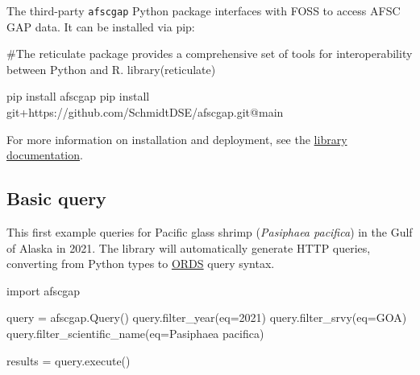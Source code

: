 \documentclass[
  letterpaper,
  oneside,
  open=any]{scrbook}
\newenvironment{Shaded}{\begin{snugshade}}{\end{snugshade}}
\newcommand{\AttributeTok}[1]{\textcolor[rgb]{0.40,0.45,0.13}{#1}}
\newcommand{\CommentTok}[1]{\textcolor[rgb]{0.37,0.37,0.37}{#1}}
\newcommand{\DecValTok}[1]{\textcolor[rgb]{0.68,0.00,0.00}{#1}}
\newcommand{\ErrorTok}[1]{\textcolor[rgb]{0.68,0.00,0.00}{#1}}
\newcommand{\FunctionTok}[1]{\textcolor[rgb]{0.28,0.35,0.67}{#1}}
\newcommand{\NormalTok}[1]{\textcolor[rgb]{0.00,0.23,0.31}{#1}}
\newcommand{\OtherTok}[1]{\textcolor[rgb]{0.00,0.23,0.31}{#1}}
\newcommand{\SpecialCharTok}[1]{\textcolor[rgb]{0.37,0.37,0.37}{#1}}
\newcommand{\StringTok}[1]{\textcolor[rgb]{0.13,0.47,0.30}{#1}}
\begin{document}
The third-party \texttt{afscgap} Python package interfaces with FOSS to
access AFSC GAP data. It can be installed via pip:

\begin{Shaded}
\begin{Highlighting}[]
\CommentTok{\#The reticulate package provides a comprehensive set of tools for interoperability between Python and R. }
\FunctionTok{library}\NormalTok{(reticulate)}
\end{Highlighting}
\end{Shaded}

\begin{Shaded}
\begin{Highlighting}[]
\NormalTok{pip install afscgap}
\NormalTok{pip install git}\SpecialCharTok{+}\NormalTok{https}\SpecialCharTok{:}\ErrorTok{//}\NormalTok{github.com}\SpecialCharTok{/}\NormalTok{SchmidtDSE}\SpecialCharTok{/}\NormalTok{afscgap.git}\SpecialCharTok{@}\NormalTok{main}
\end{Highlighting}
\end{Shaded}

For more information on installation and deployment, see the
\href{https://pyafscgap.org}{library documentation}.

\subsection{Basic query}\label{basic-query}

This first example queries for Pacific glass shrimp (\emph{Pasiphaea
pacifica}) in the Gulf of Alaska in 2021. The library will automatically
generate HTTP queries, converting from Python types to
\href{https://www.oracle.com/database/technologies/appdev/rest.html}{ORDS}
query syntax.

\begin{Shaded}
\begin{Highlighting}[]
\NormalTok{import afscgap}

\NormalTok{query }\OtherTok{=} \FunctionTok{afscgap.Query}\NormalTok{()}
\FunctionTok{query.filter\_year}\NormalTok{(}\AttributeTok{eq=}\DecValTok{2021}\NormalTok{)}
\FunctionTok{query.filter\_srvy}\NormalTok{(}\AttributeTok{eq=}\StringTok{\textquotesingle{}GOA\textquotesingle{}}\NormalTok{)}
\FunctionTok{query.filter\_scientific\_name}\NormalTok{(}\AttributeTok{eq=}\StringTok{\textquotesingle{}Pasiphaea pacifica\textquotesingle{}}\NormalTok{)}

\NormalTok{results }\OtherTok{=} \FunctionTok{query.execute}\NormalTok{()}
\end{Highlighting}
\end{Shaded}
\end{document}
